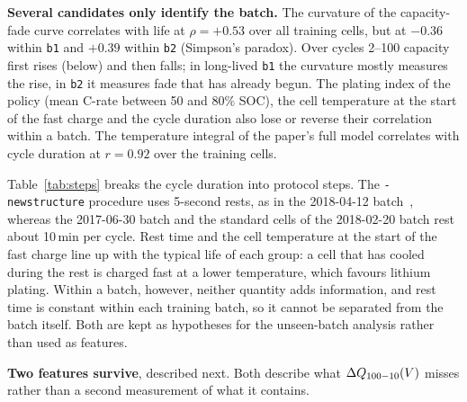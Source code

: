 \textbf{Several candidates only identify the batch.} The curvature of the
capacity-fade curve correlates with life at $\rho=+0.53$ over all training
cells, but at $-0.36$ within \texttt{b1} and $+0.39$ within \texttt{b2}
(Simpson's paradox). Over cycles 2--100 capacity first rises (below) and then
falls; in long-lived \texttt{b1} the curvature mostly measures the rise, in
\texttt{b2} it measures fade that has already begun. The plating index of
the policy (mean C-rate between 50 and 80\% SOC), the cell temperature at the
start of the fast charge and the cycle duration also lose or reverse their
correlation within a batch. The temperature integral of the paper's full
model correlates with cycle duration at $r=0.92$ over the training cells.

Table~\ref{tab:steps} breaks the cycle duration into protocol steps. The
\texttt{-newstructure} procedure uses 5-second rests, as in the 2018-04-12
batch~\cite{severson2019}, whereas the 2017-06-30 batch and the standard cells
of the 2018-02-20 batch rest about 10\,min per cycle. Rest time and the cell
temperature at the start of the fast charge line up with the typical life of
each group: a cell that has cooled during the rest is charged fast at a lower
temperature, which favours lithium plating. Within a batch, however, neither
quantity adds information, and rest time is constant within each training
batch, so it cannot be separated from the batch itself. Both are kept as
hypotheses for the unseen-batch analysis rather than used as features.

\textbf{Two features survive}, described next. Both describe what $\Delta Q_{100-10}(V)$
misses rather than a second measurement of what it contains.

